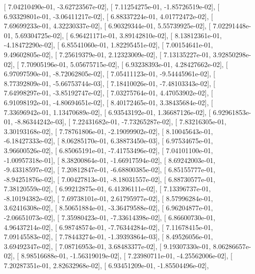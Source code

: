 \documentclass{article}
\begin{document}
       [  7.04210490e-01,  -3.62723567e-02],
       [  7.11254275e-01,  -1.85726519e-02],
       [  6.93329801e-01,  -3.06411217e-02],
       [  6.88337224e-01,   4.01772472e-02],
       [  7.69699233e-01,   4.32230337e-02],
       [  6.90329344e-01,   5.55739925e-02],
       [  7.02291448e-01,   5.69304725e-02],
       [  6.96421171e-01,   3.89142810e-02],
       [  8.13812361e-01,  -4.18472290e-02],
       [  6.85541060e-01,   1.82295451e-02],
       [  7.00154641e-01,   9.49602805e-02],
       [  7.25619379e-01,   2.12323009e-02],
       [  7.13135227e-01,   3.92850298e-02],
       [  7.70905196e-01,   5.05675715e-02],
       [  6.93238393e-01,   4.28427662e-02],
       [  6.97097590e-01,  -8.72062805e-02],
       [  7.05411123e-01,  -9.54445961e-02],
       [  8.77392809e-01,  -5.66753744e-03],
       [  7.18410026e-01,  -7.48103343e-02],
       [  7.64998297e-01,  -3.85192747e-02],
       [  7.03275764e-01,   4.47053902e-02],
       [  6.91098192e-01,  -4.80694651e-02],
       [  8.40172465e-01,   3.38435684e-02],
       [  7.33696942e-01,   1.13470689e-02],
       [  6.93543192e-01,   1.36687126e-02],
       [  6.92961853e-01,  -8.86344242e-03],
       [  7.22431682e-01,  -7.73265287e-02],
       [  7.83216305e-01,   3.30193168e-02],
       [  7.78761806e-01,  -2.19099902e-02],
       [  8.10045643e-01,  -6.18427333e-02],
       [  8.06285170e-01,   6.38873450e-03],
       [  6.97534675e-01,   3.96600526e-02],
       [  6.85065191e-01,  -7.41753496e-02],
       [  7.04101100e-01,  -1.00957318e-01],
       [  8.38200864e-01,  -1.66917594e-02],
       [  8.69242003e-01,  -9.43318597e-02],
       [  7.20812847e-01,  -6.68800385e-02],
       [  6.85155777e-01,  -8.94251876e-02],
       [  7.00427813e-01,  -8.18031557e-02],
       [  6.88730577e-01,   7.38120559e-02],
       [  6.99212875e-01,   6.41396111e-02],
       [  7.13396737e-01,  -8.10194382e-02],
       [  7.69738101e-01,   2.61795977e-02],
       [  8.57996284e-01,   3.62416308e-02],
       [  8.50651884e-01,  -3.36479588e-02],
       [  6.96204877e-01,  -2.06651073e-02],
       [  7.35980423e-01,  -7.33614398e-02],
       [  6.86600730e-01,   4.96437214e-02],
       [  6.98748574e-01,  -7.76344284e-02],
       [  7.11678415e-01,   7.09145583e-02],
       [  7.78443274e-01,  -1.39393864e-03],
       [  8.49526056e-01,   3.69492347e-02],
       [  7.08716953e-01,   3.68483377e-02],
       [  9.19307330e-01,   8.06286657e-02],
       [  8.98516688e-01,  -1.56319019e-02],
       [  7.23980711e-01,  -4.25562006e-02],
       [  7.20287351e-01,   2.82632968e-02],
       [  6.93451209e-01,  -1.85504496e-02],
\end{document}
